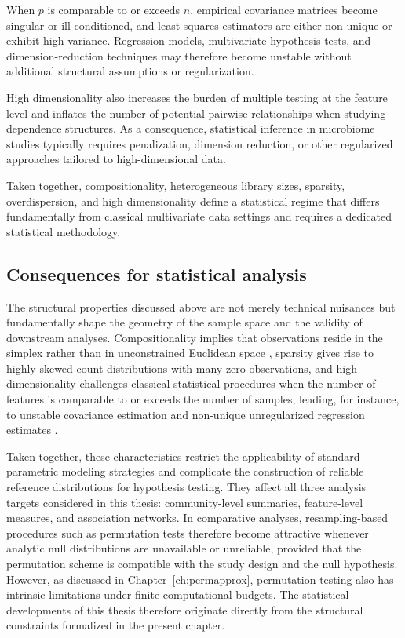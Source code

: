 When $p$ is comparable to or exceeds $n$, empirical covariance matrices become singular or ill-conditioned, and least-squares estimators are either non-unique or exhibit high variance. 
Regression models, multivariate hypothesis tests, and dimension-reduction techniques may therefore become unstable without additional structural assumptions or regularization.

High dimensionality also increases the burden of multiple testing at the feature level and inflates the number of potential pairwise relationships when studying dependence structures. 
As a consequence, statistical inference in microbiome studies typically requires penalization, dimension reduction, or other regularized approaches tailored to high-dimensional data.

Taken together, compositionality, heterogeneous library sizes, sparsity, overdispersion, and high dimensionality define a statistical regime that differs fundamentally from classical multivariate data settings and requires a dedicated statistical methodology.

\subsection{Consequences for statistical analysis}
\label{sec:2micro:charact:consequences}

The structural properties discussed above are not merely technical nuisances but fundamentally shape the geometry of the sample space and the validity of downstream analyses. Compositionality implies that observations reside in the simplex rather than in unconstrained Euclidean space \citep{aitchison1986statistical}, sparsity gives rise to highly skewed count distributions with many zero observations, and high dimensionality challenges classical statistical procedures when the number of features is comparable to or exceeds the number of samples, leading, for instance, to unstable covariance estimation and non-unique unregularized regression estimates \citep{xia2024applied}.

Taken together, these characteristics restrict the applicability of standard parametric modeling strategies and complicate the construction of reliable reference distributions for hypothesis testing. They affect all three analysis targets considered in this thesis: community-level summaries, feature-level measures, and association networks. In comparative analyses, resampling-based procedures such as permutation tests therefore become attractive whenever analytic null distributions are unavailable or unreliable, provided that the permutation scheme is compatible with the study design and the null hypothesis. However, as discussed in Chapter~\ref{ch:permapprox}, permutation testing also has intrinsic limitations under finite computational budgets. The statistical developments of this thesis therefore originate directly from the structural constraints formalized in the present chapter.

